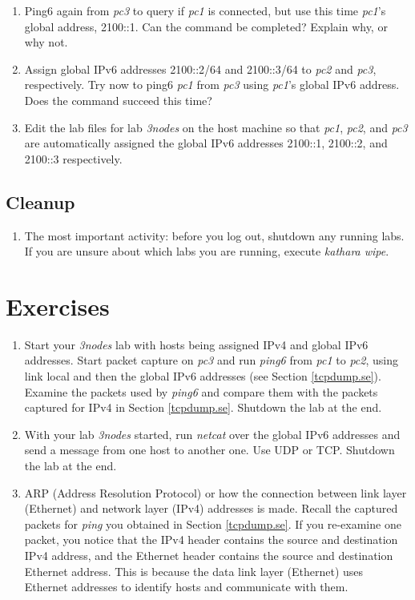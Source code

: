 \documentclass[12pt]{book}
\begin{document}
\begin{enumerate}[label=\arabic*.]
\begin{enumerate}[resume*]
\item Ping6 again from \emph{pc3} to query if \emph{pc1} is connected, but use this time \emph{pc1}'s global address, 2100::1. Can the command be completed? Explain why, or why not.

\item Assign global IPv6 addresses 2100::2/64 and 2100::3/64 to \emph{pc2} and \emph{pc3}, respectively. Try now to ping6 \emph{pc1} from \emph{pc3} using \emph{pc1}'s global IPv6 address. Does the command succeed this time?

  \item Edit the lab files for lab \emph{3nodes} on the host machine so that \emph{pc1}, \emph{pc2}, and \emph{pc3} are automatically assigned the global IPv6 addresses 2100::1, 2100::2, and 2100::3 respectively.
\end{enumerate}

\subsection{Cleanup}

\begin{enumerate}[resume*]
\item The most important activity: before you log out, shutdown any running labs. If you are unsure about which labs you are running, execute \emph{kathara wipe}.
\end{enumerate}


\section{Exercises}

\begin{enumerate}[label=\arabic*.]
\item Start your \emph{3nodes} lab with hosts being assigned IPv4 and global IPv6 addresses. Start packet capture on \emph{pc3} and run \emph{ping6} from \emph{pc1} to \emph{pc2}, using link local and then the global IPv6 addresses (see Section \ref{tcpdump.se}). Examine the packets used by \emph{ping6} and compare them with the packets captured for IPv4 in Section \ref{tcpdump.se}. Shutdown the lab at the end.
  
\item With your lab \emph{3nodes} started, run \emph{netcat} over the global IPv6 addresses and send a message from one host to another one. Use UDP or TCP. Shutdown the lab at the end.

\item\label{arp} ARP (Address Resolution Protocol) or how the connection between link layer (Ethernet) and network layer (IPv4) addresses is made. Recall the captured packets for \emph{ping} you obtained in Section \ref{tcpdump.se}. If you re-examine one packet, you notice that the IPv4 header contains the source and destination IPv4 address, and the Ethernet header contains the source and destination Ethernet address. This is because the data link layer (Ethernet) uses Ethernet addresses to identify hosts and communicate with them.


\end{enumerate}
\end{enumerate}
\end{document}
